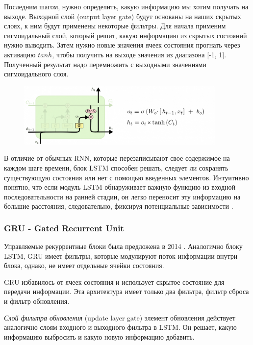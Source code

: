	Последним шагом, нужно определить, какую информацию мы хотим получать на выходе. Выходной слой (output layer gate) будут основаны на наших скрытых слоях, к ним будут применены некоторые фильтры. Для начала применим сигмоидальный слой, который решит, какую информацию из скрытых состояний нужно выводить. Затем нужно новые значения ячеек состояния прогнать через активацию $tanh$, чтобы получить на выходе значения из диапазона [-1, 1]. Полученный результат надо перемножить с выходными значениями сигмоидального слоя.

    \begin{figure}[ht!]
		\centering
		\captionsetup{justification=centering}
		\includegraphics[width=0.92\textwidth]{img/LSTM_step4.png}
	\end{figure}
	
	В отличие от обычных RNN, которые перезаписывают свое содержимое на каждом шаге времени, блок LSTM способен решать, следует ли сохранять существующую состояния или нет с помощью введенных элементов. Интуитивно понятно, что если модуль LSTM обнаруживает важную функцию из входной последовательности на ранней стадии, он легко переносит эту информацию на большие расстояния, следовательно, фиксируя потенциальные зависимости \cite{2}.
	
	\subsubsection{GRU - Gated Recurrent Unit}
	
	Управляемые рекуррентные блоки была предложена в 2014 \cite{3}. Аналогично блоку LSTM, GRU имеет фильтры, которые модулируют поток информации внутри блока, однако, не имеет отдельные ячейки состояния.
	
    GRU избавилось от ячеек состояния и использует скрытое состояние для передачи информации. Эта архитектура имеет только два фильтра, фильтр сброса и фильтр обновления.
    
    \textit{Слой фильтра обновления} (update layer gate) элемент обновления действует аналогично слоям входного и выходного фильтра в LSTM. Он решает, какую информацию выбросить и какую новую информацию добавить.
    
